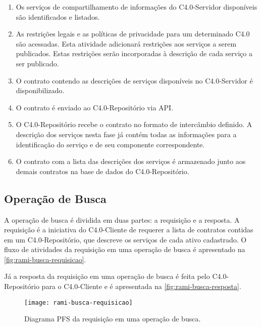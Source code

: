 \begin{enumerate}

	\item Os serviços de compartilhamento de informações do C4.0-Servidor disponíveis são identificados e listados.

	\item As restrições legais e as políticas de privacidade para um determinado C4.0 são acessadas. Esta atividade adicionará restrições aos serviços a serem publicados. Estas restrições serão incorporadas à descrição de cada serviço a ser publicado.

	\item O contrato contendo as descrições de serviços disponíveis no C4.0-Servidor é disponibilizado.

	\item O contrato é enviado ao C4.0-Repositório via API.

	\item O C4.0-Repositório recebe o contrato no formato de intercâmbio definido. A descrição dos serviços nesta fase já contém todas as informações para a identificação do serviço e de seu componente correspondente.

	\item O contrato com a lista das descrições dos serviços é armazenado junto aos demais contratos na base de dados do C4.0-Repositório.

\end{enumerate}

\subsection{Operação de Busca}

A operação de busca é dividida em duas partes: a requisição e a resposta. A requisição é a iniciativa do C4.0-Cliente de requerer a lista de contratos contidas em um C4.0-Repositório, que descreve os serviços de cada ativo cadastrado. O fluxo de atividades da requisição em uma operação de busca é apresentado na \autoref{fig:rami-busca-requisicao}.

Já a resposta da requisição em uma operação de busca é feita pelo C4.0-Repositório para o C4.0-Cliente e é apresentada na \autoref{fig:rami-busca-resposta}.

\begin{figure}[htb]
	\centering
	\texttt{[image: rami-busca-requisicao]}
	\caption{Diagrama PFS da requisição em uma operação de busca.}
	\label{fig:rami-busca-requisicao}
\end{figure}

